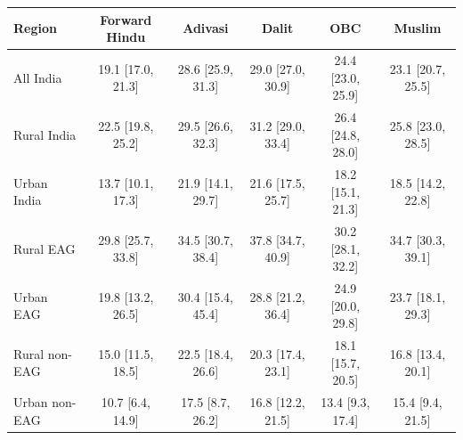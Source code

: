 \begin{tabular}{lccccc}
\hline
Region & Forward Hindu & Adivasi & Dalit & OBC & Muslim \\
\hline
All India&19.1 [17.0, 21.3]&28.6 [25.9, 31.3]&29.0 [27.0, 30.9]&24.4 [23.0, 25.9]&23.1 [20.7, 25.5]\\
Rural India&22.5 [19.8, 25.2]&29.5 [26.6, 32.3]&31.2 [29.0, 33.4]&26.4 [24.8, 28.0]&25.8 [23.0, 28.5]\\
Urban India&13.7 [10.1, 17.3]&21.9 [14.1, 29.7]&21.6 [17.5, 25.7]&18.2 [15.1, 21.3]&18.5 [14.2, 22.8]\\
Rural EAG&29.8 [25.7, 33.8]&34.5 [30.7, 38.4]&37.8 [34.7, 40.9]&30.2 [28.1, 32.2]&34.7 [30.3, 39.1]\\
Urban EAG&19.8 [13.2, 26.5]&30.4 [15.4, 45.4]&28.8 [21.2, 36.4]&24.9 [20.0, 29.8]&23.7 [18.1, 29.3]\\
Rural non-EAG&15.0 [11.5, 18.5]&22.5 [18.4, 26.6]&20.3 [17.4, 23.1]&18.1 [15.7, 20.5]&16.8 [13.4, 20.1]\\
Urban non-EAG&10.7 [6.4, 14.9]&17.5 [8.7, 26.2]&16.8 [12.2, 21.5]&13.4 [9.3, 17.4]&15.4 [9.4, 21.5]\\
\hline
\end{tabular}
